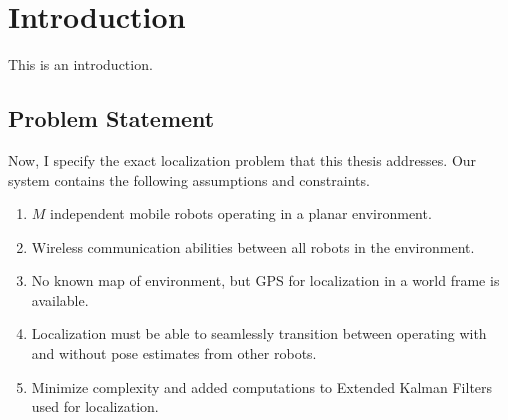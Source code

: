 \documentclass[thesis.tex]{subfile}
\begin{document}
\chapter{Introduction}
This is an introduction.

\section{Problem Statement}
Now, I specify the exact localization problem that this thesis addresses. Our system contains the following assumptions and constraints.

\begin{enumerate}
\item $M$ independent mobile robots operating in a planar environment.
\item Wireless communication abilities between all robots in the environment.
\item No known map of environment, but GPS for localization in a world frame is available.
\item Localization must be able to seamlessly transition between operating with and without pose estimates from other robots.
\item Minimize complexity and added computations to Extended Kalman Filters used for localization.
\end{enumerate}
\end{document}
